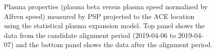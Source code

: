 \documentclass[
  letterpaper,
  DIV=11,
  numbers=noendperiod]{scrartcl}
\begin{document}
\begin{figure}


\caption{\label{fig-evolution}Plasma properties (plasma beta versus plasma speed normalized by Alfven speed) measured by PSP projected to the ACE location using the statistical plasma expansion model. Top panel shows the data from the candidate alignment period (2019-04-06 to 2019-04-07) and the bottom panel shows the data after the alignment period.}

\end{figure}%

\newpage{}





\end{document}
